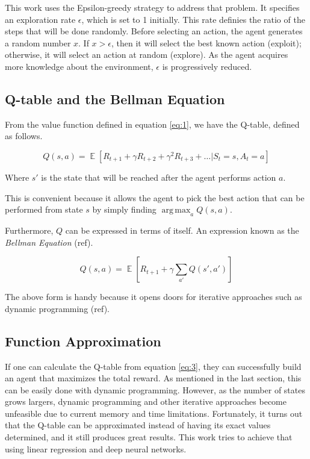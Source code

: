 \documentclass[11pt,twoside]{article}
\DeclareMathOperator*{\E}{\mathbb{E}}
\begin{document}
This work uses the Epsilon-greedy strategy to address that problem. It specifies an exploration rate $\epsilon$, which is set to 1 initially. This rate definies the ratio of the steps that will be done randomly. Before selecting an action, the agent generates a random number $x$. If $x > \epsilon$, then it will select the best known action (exploit); otherwise, it will select an action at random (explore). As the agent acquires more knowledge about the environment, $\epsilon$ is progressively reduced.

\subsection{Q-table and the Bellman Equation}

From the value function defined in equation \ref{eq:1}, we have the Q-table, defined as follows.

\begin{equation} \label{eq:2}
	Q(s, a) = \E [R_{t+1} + \gamma R_{t+2} + \gamma^{2} R_{t+3} + \ldots | S_t = s, A_t = a]
\end{equation}

Where $s'$ is the state that will be reached after the agent performs action $a$.

This is convenient because it allows the agent to pick the best action that can be performed from state $s$ by simply finding $\operatorname*{arg\,max}_{a} Q(s,a)$.

Furthermore, $Q$ can be expressed in terms of itself. An expression known as the \textit{Bellman Equation} (ref).

\begin{equation} \label{eq:3}
	Q(s, a) = \E [R_{t+1} + \gamma \sum_{a'} Q(s', a')]
\end{equation}

The above form is handy because it opens doors for iterative approaches such as dynamic programming (ref).

\subsection{Function Approximation}

If one can calculate the Q-table from equation \ref{eq:3}, they can successfully build an agent that maximizes the total reward. As mentioned in the last section, this can be easily done with dynamic programming. However, as the number of states grows largers, dynamic programming and other iterative approaches become unfeasible due to current memory and time limitations. Fortunately, it turns out that the Q-table can be approximated instead of having its exact values determined, and it still produces great results. This work tries to achieve that using linear regression and deep neural networks.
\end{document}
